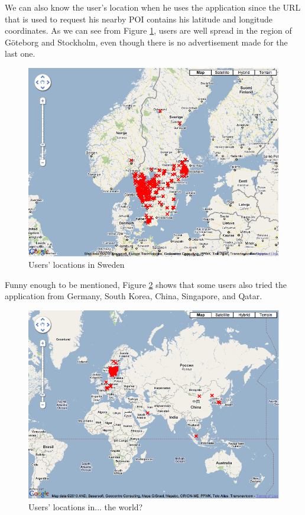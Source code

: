 We can also know the user's location when he uses the application since the URL that is used to request his nearby POI contains his latitude and longitude coordinates. As we can see from Figure \ref{fig:locations_sweden}, users are well spread in the region of Göteborg and Stockholm, even though there is no advertisement made for the last one.\\

\begin{figure}[ht]
\center
\includegraphics[scale=0.4]{pics/locations_sweden}
\caption{Users' locations in Sweden}
\label{fig:locations_sweden}
\end{figure}

Funny enough to be mentioned, Figure \ref{fig:locations_world} shows that some users also tried the application from Germany, South Korea, China, Singapore, and Qatar.

\begin{figure}[ht]
\center
\includegraphics[scale=0.4]{pics/locations_world}
\caption{Users' locations in... the world?}
\label{fig:locations_world}
\end{figure}

